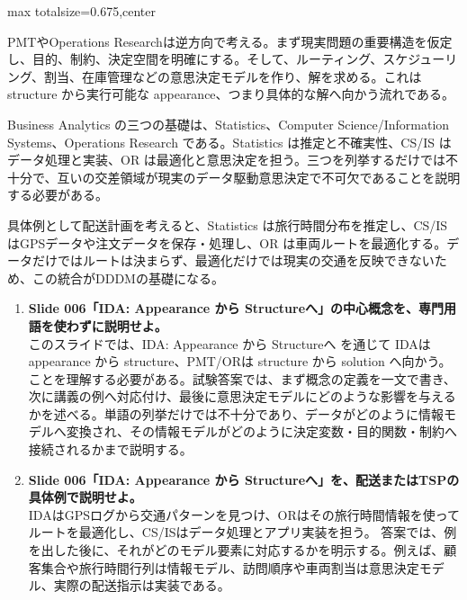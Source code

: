 \begin{adjustbox}{max totalsize={\textwidth}{0.675\textheight},center}
\begin{minipage}{\textwidth}
\begin{minipage}[t]{0.485\textwidth}
PMTやOperations Researchは逆方向で考える。まず現実問題の重要構造を仮定し、目的、制約、決定空間を明確にする。そして、ルーティング、スケジューリング、割当、在庫管理などの意思決定モデルを作り、解を求める。これは structure から実行可能な appearance、つまり具体的な解へ向かう流れである。\par
Business Analytics の三つの基礎は、Statistics、Computer Science/Information Systems、Operations Research である。Statistics は推定と不確実性、CS/IS はデータ処理と実装、OR は最適化と意思決定を担う。三つを列挙するだけでは不十分で、互いの交差領域が現実のデータ駆動意思決定で不可欠であることを説明する必要がある。\par
具体例として配送計画を考えると、Statistics は旅行時間分布を推定し、CS/IS はGPSデータや注文データを保存・処理し、OR は車両ルートを最適化する。データだけではルートは決まらず、最適化だけでは現実の交通を反映できないため、この統合がDDDMの基礎になる。\par
{}
\begin{enumerate}
\item \textbf{Slide 006「IDA: Appearance から Structureへ」の中心概念を、専門用語を使わずに説明せよ。}\\このスライドでは、IDA: Appearance から Structureへ を通じて IDAは appearance から structure、PMT/ORは structure から solution へ向かう。 ことを理解する必要がある。試験答案では、まず概念の定義を一文で書き、次に講義の例へ対応付け、最後に意思決定モデルにどのような影響を与えるかを述べる。単語の列挙だけでは不十分であり、データがどのように情報モデルへ変換され、その情報モデルがどのように決定変数・目的関数・制約へ接続されるかまで説明する。
\item \textbf{Slide 006「IDA: Appearance から Structureへ」を、配送またはTSPの具体例で説明せよ。}\\IDAはGPSログから交通パターンを見つけ、ORはその旅行時間情報を使ってルートを最適化し、CS/ISはデータ処理とアプリ実装を担う。 答案では、例を出した後に、それがどのモデル要素に対応するかを明示する。例えば、顧客集合や旅行時間行列は情報モデル、訪問順序や車両割当は意思決定モデル、実際の配送指示は実装である。
\end{enumerate}
\end{minipage}
\end{minipage}
\end{adjustbox}

